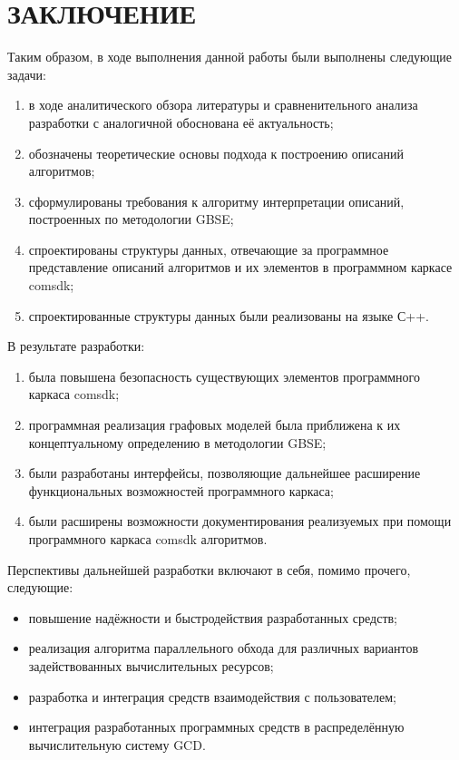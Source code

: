\chapter*{ЗАКЛЮЧЕНИЕ}\label{chap_conclusion}
Таким образом, в ходе выполнения данной работы были выполнены следующие задачи:
\begin{enumerate}[1)]
    \item в ходе аналитического обзора литературы и сравненительного анализа разработки с аналогичной обоснована её актуальность;
    \item обозначены теоретические основы подхода  к построению описаний алгоритмов;
    \item сформулированы требования к алгоритму интерпретации описаний, построенных по методологии GBSE;
    \item спроектированы структуры данных, отвечающие за программное представление описаний алгоритмов и их элементов в программном каркасе comsdk;
    \item спроектированные структуры данных были реализованы на языке С++.
\end{enumerate}

В результате разработки:
\begin{enumerate}[1)]
    \item была повышена безопасность существующих элементов программного каркаса comsdk;
    \item программная реализация графовых моделей была приближена к их концептуальному определению в методологии GBSE;
    \item были разработаны интерфейсы, позволяющие дальнейшее расширение функциональных возможностей программного каркаса;
    \item были расширены возможности документирования реализуемых при помощи программного каркаса comsdk алгоритмов.
\end{enumerate}

Перспективы дальнейшей разработки включают в себя, помимо прочего, следующие:
\begin{itemize}
    \item повышение надёжности и быстродействия разработанных средств;
    \item реализация алгоритма параллельного обхода для различных вариантов задействованных вычислительных ресурсов;
    \item разработка и интеграция средств взаимодействия с пользователем;
    \item интеграция разработанных программных средств в распределённую вычислительную систему GCD.
\end{itemize}
